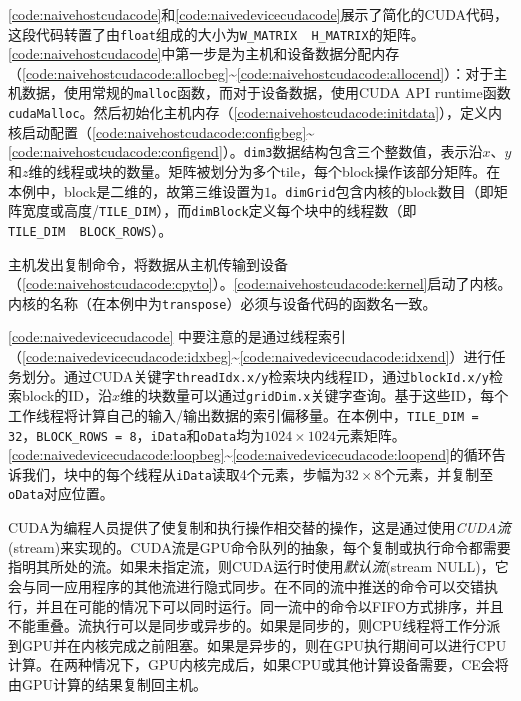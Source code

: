 \autoref{code:naivehostcudacode}和\autoref{code:naivedevicecudacode}展示了简化的CUDA代码，这段代码转置了由\texttt{float}组成的大小为\texttt{W\_MATRIX\ \times\ H\_MATRIX}的矩阵。\autoref{code:naivehostcudacode}中第一步是为主机和设备数据分配内存（\autoref{code:naivehostcudacode:allocbeg}\textasciitilde\autoref{code:naivehostcudacode:allocend}）：对于主机数据，使用常规的\texttt{malloc}函数，而对于设备数据，使用CUDA API runtime函数\texttt{cudaMalloc}。然后初始化主机内存（\autoref{code:naivehostcudacode:initdata}），定义内核启动配置（\autoref{code:naivehostcudacode:configbeg}\textasciitilde\autoref{code:naivehostcudacode:configend}）。\texttt{dim3}数据结构包含三个整数值，表示沿$x$、$y$和$z$维的线程或块的数量。矩阵被划分为多个tile，每个block操作该部分矩阵。在本例中，block是二维的，故第三维设置为$1$。\texttt{dimGrid}包含内核的block数目（即矩阵宽度或高度/\texttt{TILE\_DIM}），而\texttt{dimBlock}定义每个块中的线程数（即\texttt{TILE\_DIM\ \times\ BLOCK\_ROWS}）。

主机发出复制命令，将数据从主机传输到设备（\autoref{code:naivehostcudacode:cpyto}）。\autoref{code:naivehostcudacode:kernel}启动了内核。内核的名称（在本例中为\texttt{transpose}）必须与设备代码的函数名一致。

\autoref{code:naivedevicecudacode} 中要注意的是通过线程索引（\autoref{code:naivedevicecudacode:idxbeg}\textasciitilde\autoref{code:naivedevicecudacode:idxend}）进行任务划分。通过CUDA关键字\texttt{threadIdx.x/y}检索块内线程ID，通过\texttt{blockId.x/y}检索block的ID，沿$x$维的块数量可以通过\texttt{gridDim.x}关键字查询。基于这些ID，每个工作线程将计算自己的输入/输出数据的索引偏移量。在本例中，\texttt{TILE\_DIM = 32}，\texttt{BLOCK\_ROWS = 8}，\texttt{iData}和\texttt{oData}均为$ 1024\times 1024 $元素矩阵。\autoref{code:naivedevicecudacode:loopbeg}\textasciitilde\autoref{code:naivedevicecudacode:loopend}的循环告诉我们，块中的每个线程从\texttt{iData}读取4个元素，步幅为$32 \times 8$个元素，并复制至\texttt{oData}对应位置。

CUDA为编程人员提供了使复制和执行操作相交替的操作，这是通过使用\emph{CUDA流}(stream)来实现的。CUDA流是GPU命令队列的抽象，每个复制或执行命令都需要指明其所处的流。如果未指定流，则CUDA运行时使用\emph{默认流}(stream NULL)，它会与同一应用程序的其他流进行隐式同步。在不同的流中推送的命令可以交错执行，并且在可能的情况下可以同时运行。同一流中的命令以FIFO方式排序，并且不能重叠。流执行可以是同步或异步的。如果是同步的，则CPU线程将工作分派到GPU并在内核完成之前阻塞。如果是异步的，则在GPU执行期间可以进行CPU计算。在两种情况下，GPU内核完成后，如果CPU或其他计算设备需要，CE会将由GPU计算的结果复制回主机。


